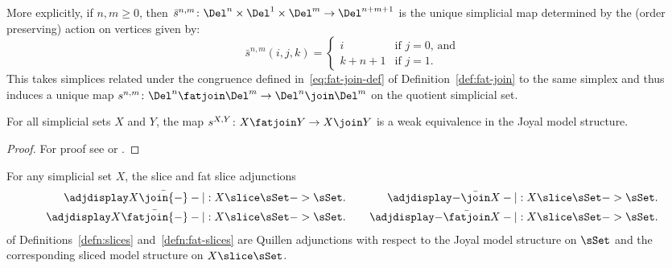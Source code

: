 \begin{obs}
    More explicitly, if $n,m\geq 0$, then $\bar{s}^{n,m}\colon\Del^n\times\Del^1\times\Del^m\to\Del^{n+m+1}$ is the unique simplicial map determined by the (order preserving) action on vertices given by:
    \begin{equation}\label{eq:tnm-def}
      \bar{s}^{n,m}(i,j,k) = 
      \begin{cases}
        i & \text{if $j=0$, and} \\
        k+n+1 & \text{if $j=1$.}
      \end{cases}
    \end{equation}
    This takes simplices related under the congruence defined in~\eqref{eq:fat-join-def} of Definition~\ref{def:fat-join} to the same simplex and thus induces a unique map $s^{n,m}\colon\Del^n\fatjoin\Del^m\to\Del^n\join\Del^m$ on the quotient simplicial set.
  \end{obs}

  \begin{prop}\label{prop:join-fatjoin-equiv}
    For all simplicial sets $X$ and $Y$, the  map $s^{X,Y}\colon X\fatjoin Y\to X\join Y$ is a weak equivalence in the Joyal model structure.
  \end{prop}
\begin{proof} For proof see \cite[4.2.1.2]{Lurie:2009fk} or \cite[A.4.11]{RiehlVerity:2015tt-v3}.

\end{proof}


  \begin{lem}\label{lem:slices-quillen}
 For any simplicial set $X$, the slice and fat slice adjunctions
    \begin{align*}
  		\adjdisplay \textstyle X\bar\join{-}-|{} :X\slice\sSet->\sSet. & 
      \mkern20mu & 
  		\adjdisplay \textstyle {-}\bar\join X-|{} :X\slice\sSet->\sSet. \\
  		\adjdisplay \textstyle X\bar\fatjoin{-}-|{}:X\slice\sSet->\sSet. & 
      \mkern20mu & 
  		\adjdisplay \textstyle {-}\bar\fatjoin X-|{}:X\slice\sSet->\sSet.
    \end{align*}
    of Definitions~\ref{defn:slices} and~\ref{defn:fat-slices} are Quillen adjunctions with respect to the Joyal model structure on $\sSet$ and the corresponding sliced model structure on $X\slice\sSet$.
  \end{lem}
  
